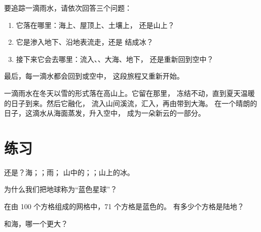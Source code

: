 \begin{method}[追踪一滴雨水]\label{met:g2:water-on-earth:drop}
要追踪一滴雨水，请依次回答三个问题：
\begin{enumerate}
  \item 它落在哪里：海上、屋顶上、土壤上，
        还是山上？
  \item 它是渗入地下、沿地表流走，还是
        结成冰？
  \item 接下来它会去哪里：流入、、大海、地下，
        还是重新回到空中？
\end{enumerate}
最后，每一滴水都会回到或空中，
这段旅程又重新开始。
\end{method}

\begin{example}[一滴落在山上的雨水]\label{ex:g2:water-on-earth:mountain}
一滴雨水在冬天以雪的形式落在高山上。它留在那里，
冻结不动，直到夏天温暖的日子到来。然后它融化，
流入山间溪流，汇入，再由带到大海。
在一个晴朗的日子，这滴水从海面蒸发，升入空中，
成为一朵新云的一部分。
\end{example}

\section{练习}

\begin{exercise}[$\star$]\label{exo:g2:water-on-earth:1}
还是？海；；雨；
山中的；；山上的冰。
\end{exercise}

\begin{exercise}[$\star$]\label{exo:g2:water-on-earth:2}
为什么我们把地球称为“蓝色星球”？
\end{exercise}

\begin{exercise}[$\star$]\label{exo:g2:water-on-earth:3}
在由 100 个方格组成的网格中，71 个方格是蓝色的。
有多少个方格是陆地？
\end{exercise}

\begin{exercise}[$\star$]\label{exo:g2:water-on-earth:4}
和海，哪一个更大？
\end{exercise}

